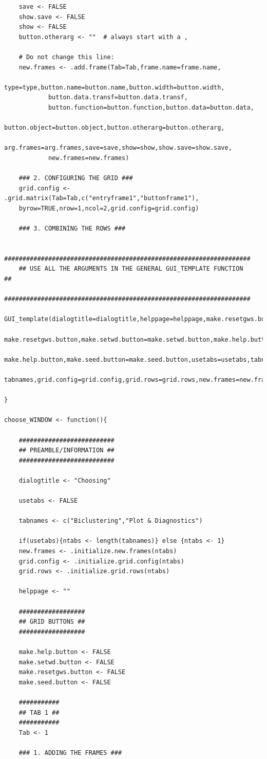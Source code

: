\documentclass[a4paper]{article}\usepackage[]{graphicx}\usepackage[]{color}
\begin{document}
\begin{verbatim}
	save <- FALSE
	show.save <- FALSE
	show <- FALSE
	button.otherarg <- ""  # always start with a ,
	
	# Do not change this line: 
	new.frames <- .add.frame(Tab=Tab,frame.name=frame.name,
			type=type,button.name=button.name,button.width=button.width,
			button.data.transf=button.data.transf,
			button.function=button.function,button.data=button.data,
			button.object=button.object,button.otherarg=button.otherarg,
			arg.frames=arg.frames,save=save,show=show,show.save=show.save,
			new.frames=new.frames)
	
	### 2. CONFIGURING THE GRID ###
	grid.config <- .grid.matrix(Tab=Tab,c("entryframe1","buttonframe1"),
    byrow=TRUE,nrow=1,ncol=2,grid.config=grid.config)
		
	### 3. COMBINING THE ROWS ###
	
	###################################################################
	## USE ALL THE ARGUMENTS IN THE GENERAL GUI_TEMPLATE FUNCTION    ##
	###################################################################
	GUI_template(dialogtitle=dialogtitle,helppage=helppage,make.resetgws.button=
    make.resetgws.button,make.setwd.button=make.setwd.button,make.help.button=
    make.help.button,make.seed.button=make.seed.button,usetabs=usetabs,tabnames=
    tabnames,grid.config=grid.config,grid.rows=grid.rows,new.frames=new.frames)
	
}

choose_WINDOW <- function(){
	
	##########################
	## PREAMBLE/INFORMATION ##
	##########################
	
	dialogtitle <- "Choosing"
		
	usetabs <- FALSE
	
	tabnames <- c("Biclustering","Plot & Diagnostics")
	
	if(usetabs){ntabs <- length(tabnames)} else {ntabs <- 1}
	new.frames <- .initialize.new.frames(ntabs)
	grid.config <- .initialize.grid.config(ntabs)
	grid.rows <- .initialize.grid.rows(ntabs)
		
	helppage <- ""
	
	##################
	## GRID BUTTONS ##
	##################
	
	make.help.button <- FALSE
	make.setwd.button <- FALSE
	make.resetgws.button <- FALSE
	make.seed.button <- FALSE
	
	###########
	## TAB 1 ##
	###########
	Tab <- 1
	
	### 1. ADDING THE FRAMES ###
		

\end{verbatim}
\end{document}
